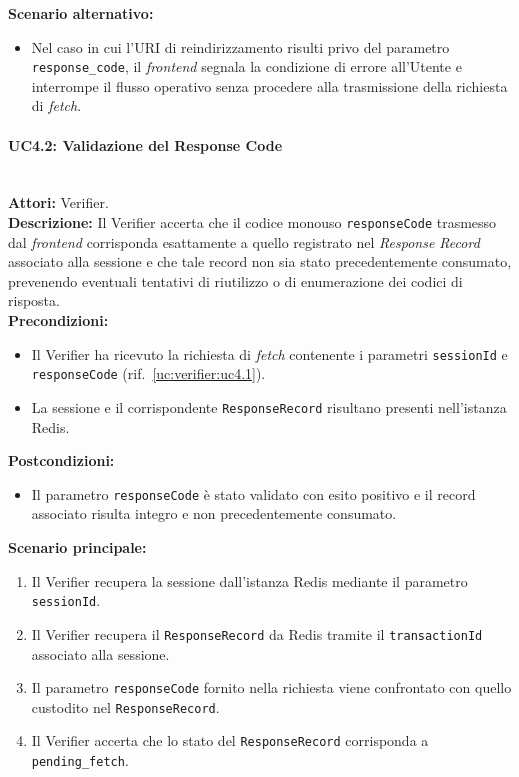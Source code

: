 \noindent\textbf{Scenario alternativo:}
\begin{itemize}
    \item Nel caso in cui l'URI di reindirizzamento risulti privo del parametro \texttt{response\_\allowbreak{}code}, il \textit{frontend} segnala la condizione di errore all'Utente e interrompe il flusso operativo senza procedere alla trasmissione della richiesta di \textit{fetch}.
\end{itemize}

\paragraph{\large\bfseries UC4.2: Validazione del Response Code}
\label{uc:verifier:uc4.2}
\mbox{}\\
\noindent\textbf{Attori:} Verifier.
\\
\noindent\textbf{Descrizione:} Il Verifier accerta che il codice monouso \texttt{responseCode} trasmesso dal \textit{frontend} corrisponda esattamente a quello registrato nel \textit{Response Record} associato alla sessione e che tale record non sia stato precedentemente consumato, prevenendo eventuali tentativi di riutilizzo o di enumerazione dei codici di risposta.
\\
\noindent\textbf{Precondizioni:}
\begin{itemize}
    \item Il Verifier ha ricevuto la richiesta di \textit{fetch} contenente i parametri \texttt{sessionId} e \texttt{responseCode} (rif.\ \ref{uc:verifier:uc4.1}).
    \item La sessione e il corrispondente \texttt{ResponseRecord} risultano presenti nell'istanza Redis.
\end{itemize}
\noindent\textbf{Postcondizioni:}
\begin{itemize}
    \item Il parametro \texttt{responseCode} è stato validato con esito positivo e il record associato risulta integro e non precedentemente consumato.
\end{itemize}

\noindent\textbf{Scenario principale:}
\begin{enumerate}
    \item Il Verifier recupera la sessione dall'istanza Redis mediante il parametro \texttt{sessionId}.
    \item Il Verifier recupera il \texttt{ResponseRecord} da Redis tramite il \texttt{transactionId} associato alla sessione.
    \item Il parametro \texttt{responseCode} fornito nella richiesta viene confrontato con quello custodito nel \texttt{ResponseRecord}.
    \item Il Verifier accerta che lo stato del \texttt{ResponseRecord} corrisponda a \texttt{pending\_\allowbreak{}fetch}.
\end{enumerate}

